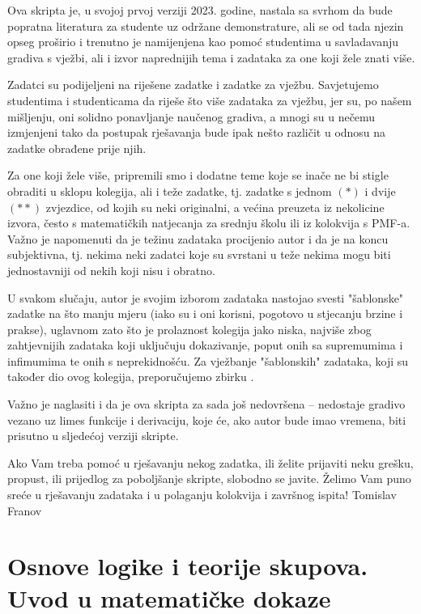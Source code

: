 \documentclass{book}
\begin{document}
Ova skripta je, u svojoj prvoj verziji 2023. godine, nastala sa svrhom da bude popratna literatura za studente uz održane demonstrature, ali se od tada njezin opseg proširio i trenutno je namijenjena kao pomoć studentima u savladavanju gradiva s vježbi, ali i izvor naprednijih tema i zadataka za one koji žele znati više. 

Zadatci su podijeljeni na riješene zadatke i zadatke za vježbu. Savjetujemo studentima i studenticama da riješe što više zadataka za vježbu, jer su, po našem mišljenju, oni solidno ponavljanje naučenog gradiva, a mnogi su u nečemu izmjenjeni tako da postupak rješavanja bude ipak nešto različit u odnosu na zadatke obrađene prije njih.

Za one koji žele više, pripremili smo i dodatne teme koje se inače ne bi stigle obraditi u sklopu kolegija, ali i teže zadatke, tj. zadatke s jednom $(*)$ i dvije $(**)$ zvjezdice, od kojih su neki originalni, a većina preuzeta iz nekolicine izvora, često s matematičkih natjecanja za srednju školu ili iz kolokvija s PMF-a. Važno je napomenuti da je težinu zadataka procijenio autor i da je na koncu subjektivna, tj. nekima neki zadatci koje su svrstani u teže nekima mogu biti jednostavniji od nekih koji nisu i obratno.

U svakom slučaju, autor je svojim izborom zadataka nastojao svesti "šablonske" zadatke na što manju mjeru (iako su i oni korisni, pogotovo u stjecanju brzine i prakse), uglavnom zato što je prolaznost kolegija jako niska, najviše zbog zahtjevnijih zadataka koji uključuju dokazivanje, poput onih sa supremumima i infimumima te onih s neprekidnošću. Za vježbanje "šablonskih" zadataka, koji su također dio ovog kolegija, preporučujemo zbirku \cite{8}.

Važno je naglasiti i da je ova skripta za sada još nedovršena -- nedostaje gradivo vezano uz limes funkcije i derivaciju, koje će, ako autor bude imao vremena, biti prisutno u sljedećoj verziji skripte.

Ako Vam treba pomoć u rješavanju nekog zadatka, ili želite prijaviti neku grešku, propust, ili prijedlog za poboljšanje skripte, slobodno se javite. Želimo Vam puno sreće u rješavanju zadataka i u polaganju kolokvija i završnog ispita!
\flushright
\flushleft
\justifying
\noindent Tomislav Franov
\thispagestyle{empty}
\large
\pagestyle{fancy}
\fancyhead[RO, RE]{}
\chapter{Osnove logike i teorije skupova. Uvod u matematičke dokaze}
\end{document}
